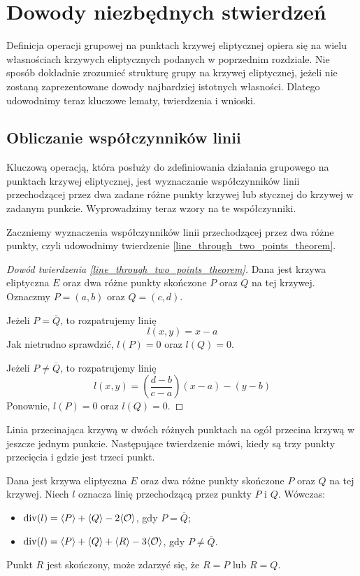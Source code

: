 \section{Dowody niezbędnych stwierdzeń}

Definicja operacji grupowej na punktach krzywej eliptycznej
opiera się na wielu własnościach krzywych eliptycznych
podanych w poprzednim rozdziale.
Nie sposób dokładnie zrozumieć strukturę grupy na krzywej eliptycznej,
jeżeli nie zostaną zaprezentowane dowody najbardziej istotnych własności.
Dlatego udowodnimy teraz kluczowe lematy, twierdzenia i wnioski.

\subsection*{Obliczanie współczynników linii}

Kluczową operacją, która posłuży do zdefiniowania działania grupowego
na punktach krzywej eliptycznej,
jest wyznaczanie współczynników
linii przechodzącej przez dwa zadane różne punkty krzywej
lub stycznej do krzywej w zadanym punkcie.
Wyprowadzimy teraz wzory na te współczynniki.

Zaczniemy wyznaczenia współczynników
linii przechodzącej przez dwa różne punkty,
czyli udowodnimy twierdzenie \ref{line_through_two_points_theorem}.

\begin{proof}[Dowód twierdzenia \ref{line_through_two_points_theorem}]
Dana jest krzywa eliptyczna $E$
oraz dwa różne punkty skończone $P$ oraz $Q$ na tej krzywej.
Oznaczmy $P = (a, b)$ oraz $Q = (c, d)$.

Jeżeli $P = \overline{Q}$,
to rozpatrujemy linię
\begin{equation}
l(x, y) = x - a
\end{equation}
Jak nietrudno sprawdzić, $l(P) = 0$ oraz $l(Q) = 0$.

Jeżeli $P \neq \overline{Q}$,
to rozpatrujemy linię
\begin{equation}
l(x, y) = \left(\frac{d-b}{c-a}\right)(x - a) - (y - b)
\end{equation}
Ponownie, $l(P) = 0$ oraz $l(Q) = 0$.
\end{proof}

Linia przecinająca krzywą w dwóch różnych punktach
na ogół przecina krzywą w jeszcze jednym punkcie.
Następujące twierdzenie mówi,
kiedy są trzy punkty przecięcia
i gdzie jest trzeci punkt.

\begin{theorem}
Dana jest krzywa eliptyczna $E$
oraz dwa różne punkty skończone $P$ oraz $Q$ na tej krzywej.
Niech $l$ oznacza linię przechodzącą przez punkty $P$ i $Q$.
Wówczas:
\begin{itemize}
\item $\operatorname{div}(l) = \langle P\rangle + \langle Q\rangle - 2\langle\mathcal{O}\rangle$,
gdy $P = \overline{Q}$;
\item $\operatorname{div}(l) = \langle P\rangle + \langle Q\rangle + \langle R\rangle - 3\langle\mathcal{O}\rangle$,
gdy $P \neq \overline{Q}$.
\end{itemize}
Punkt $R$ jest skończony,
może zdarzyć się, że $R = P$ lub $R = Q$.
\end{theorem}

